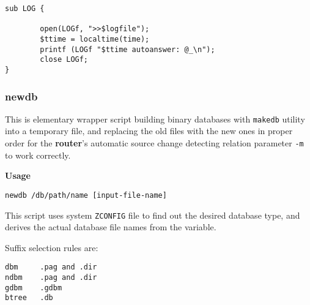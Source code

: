 \begin{tscreen}
\begin{verbatim}
sub LOG {

        open(LOGf, ">>$logfile");
        $ttime = localtime(time);
        printf (LOGf "$ttime autoanswer: @_\n");
        close LOGf;
}
\end{verbatim}
\end{tscreen}





\subsubsection{newdb}



This is elementary wrapper script building binary databases
with {\tt makedb} utility into a temporary file, and replacing
the old files with the new ones in proper order for the 
{\bf router}'s automatic source change detecting relation 
parameter {\tt -m} to work correctly.

{\bf Usage}

\begin{tscreen}
\begin{verbatim}
newdb /db/path/name [input-file-name]
\end{verbatim}
\end{tscreen}


This script uses system {\tt ZCONFIG} file to find out the desired
database type, and derives the actual database file names from the 
variable.

Suffix selection rules are:

\begin{tscreen}
\begin{verbatim}
dbm     .pag and .dir
ndbm    .pag and .dir
gdbm    .gdbm
btree   .db   
\end{verbatim}
\end{tscreen}


